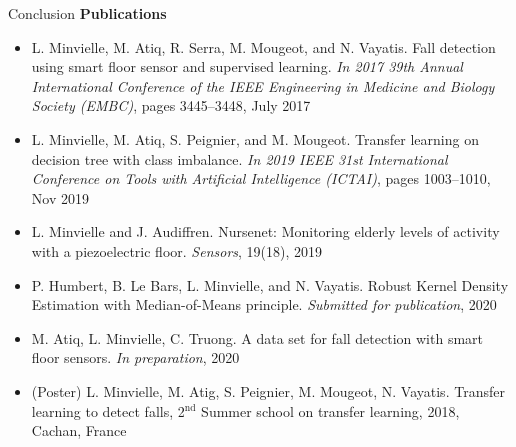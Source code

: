 \begin{frame}{Conclusion}
\centering
\textbf{Publications}
\begin{itemize}
    \small
    \item L. Minvielle, M. Atiq, R. Serra, M. Mougeot, and N. Vayatis. \textcolor{myblue}{Fall detection using smart floor sensor and supervised learning.}
\textit{In 2017 39th Annual International Conference of the IEEE Engineering in Medicine and Biology Society (EMBC)}, pages
3445–3448, July 2017
    \item L. Minvielle, M. Atiq, S. Peignier, and M. Mougeot. \textcolor{myblue}{Transfer learning on decision tree with class imbalance.}
\textit{In 2019 IEEE 31st International Conference on Tools with Artificial Intelligence (ICTAI)}, pages 1003–1010, Nov 2019
    \item L. Minvielle and J. Audiffren. \textcolor{myblue}{Nursenet: Monitoring elderly levels of activity with a piezoelectric floor.}
\textit{Sensors}, 19(18), 2019
    \item P. Humbert, B. Le Bars, L. Minvielle, and N. Vayatis. \textcolor{myblue}{Robust Kernel Density Estimation with Median-of-Means principle}. \textit{Submitted for publication}, 2020
    \item M. Atiq, L. Minvielle, C. Truong. \textcolor{myblue}{A data set for fall detection with smart floor sensors.} \textit{In preparation}, 2020
    \item (Poster) L. Minvielle, M. Atig, S. Peignier, M. Mougeot, N. Vayatis. \textcolor{myblue}{Transfer learning to detect falls}, 2$^{\text{nd}}$ Summer school on transfer learning, 2018, Cachan, France 
\end{itemize}


\vfill
\end{frame}
